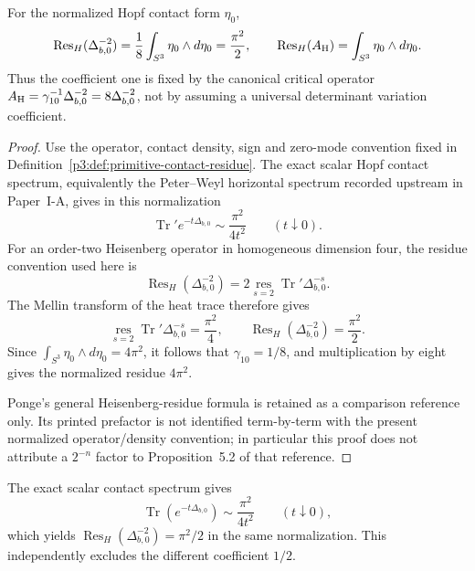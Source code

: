 \documentclass[12pt,a4paper]{article}
\begin{document}
\begin{theorem}
\label{p3:prop:contact-residue-normalization}
For the normalized Hopf contact form \(\eta_0\),
\begin{equation}
\label{p3:eq:canonical-hopf-residue-normalization}
 \operatorname{Res}_{H}(\Delta_{b,0}^{-2})
 =\frac18\int_{S^3}\eta_0\wedge d\eta_0
 =\frac{\pi^2}{2},
 \qquad
 \operatorname{Res}_{H}(A_{\rm H})
 =\int_{S^3}\eta_0\wedge d\eta_0.
\end{equation}
Thus the coefficient one is fixed by the canonical critical operator
\(A_{\rm H}=\gamma_{10}^{-1}\Delta_{b,0}^{-2}
=8\Delta_{b,0}^{-2}\), not by assuming a universal determinant
variation coefficient.
\end{theorem}

\begin{proof}
Use the operator, contact density, sign and zero-mode convention fixed in
Definition~\ref{p3:def:primitive-contact-residue}.  The exact scalar Hopf
contact spectrum, equivalently the Peter--Weyl horizontal spectrum recorded
upstream in Paper~I-A, gives in this normalization
\[
 \operatorname{Tr}'e^{-t\Delta_{b,0}}
 \sim \frac{\pi^2}{4t^2}
 \qquad(t\downarrow0).
\]
For an order-two Heisenberg operator in homogeneous dimension four, the
residue convention used here is
\[
 \operatorname{Res}_{H}(\Delta_{b,0}^{-2})
 =2\operatorname*{res}_{s=2}
 \operatorname{Tr}'\Delta_{b,0}^{-s}.
\]
The Mellin transform of the heat trace therefore gives
\[
 \operatorname*{res}_{s=2}\operatorname{Tr}'\Delta_{b,0}^{-s}
 =\frac{\pi^2}{4},
 \qquad
 \operatorname{Res}_{H}(\Delta_{b,0}^{-2})=\frac{\pi^2}{2}.
\]
Since
\(\int_{S^3}\eta_0\wedge d\eta_0=4\pi^2\), it follows that
\(\gamma_{10}=1/8\), and multiplication by eight gives the normalized
residue \(4\pi^2\).

Ponge's general Heisenberg-residue formula is retained as a comparison
reference only.  Its printed prefactor is not identified term-by-term with
the present normalized operator/density convention; in particular this proof
does not attribute a \(2^{-n}\) factor to Proposition~5.2 of that reference.
\end{proof}

\begin{remark}
\label{p3c:rem:contact-coefficient-spectrum-check}
The exact scalar contact spectrum gives
\[
 \operatorname{Tr}(e^{-t\Delta_{b,0}})
 \sim \frac{\pi^2}{4t^2}
 \qquad(t\downarrow0),
\]
which yields
\(\operatorname{Res}_{H}(\Delta_{b,0}^{-2})=\pi^2/2\) in the same
normalization.  This independently excludes the different coefficient \(1/2\).
\end{remark}
\end{document}
